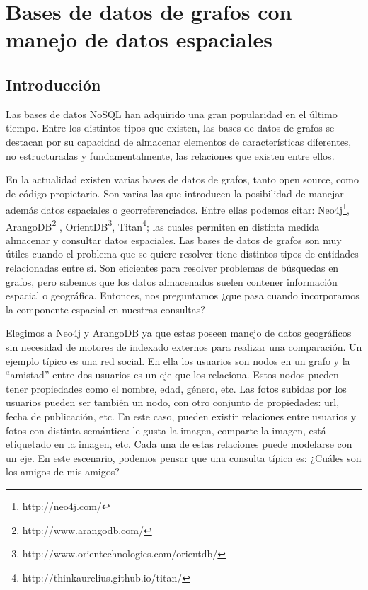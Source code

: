\documentclass{llncs}
\begin{document}
\maketitle              %

\begin{abstract} The abstract should summarize the contents of the
paper using at least 70 and at most 150 words. It will be set in
9-point font size and be inset 1.0 cm from the right and left margins.
There will be two blank lines before and after the Abstract. \dots
{}
\end{abstract} %

\section{Bases de datos de grafos con manejo de datos espaciales}
\subsection{Introducción} %
Las bases de datos NoSQL han
adquirido una gran popularidad en el último tiempo. Entre los
distintos tipos que existen, las bases de datos de grafos se destacan
por su capacidad de almacenar elementos de características diferentes,
no estructuradas y fundamentalmente, las relaciones que existen entre
ellos.

En la actualidad existen varias bases de datos de grafos, tanto open
source, como de código propietario. Son varias las que introducen la
posibilidad de manejar además datos espaciales o georreferenciados.
Entre ellas podemos citar: Neo4j\footnote{http://neo4j.com/}, ArangoDB\footnote{http://www.arangodb.com/}
, OrientDB\footnote{http://www.orientechnologies.com/orientdb/}, Titan\footnote{http://thinkaurelius.github.io/titan/}; las
cuales permiten en distinta medida almacenar y consultar datos
espaciales. Las bases de datos de grafos son muy útiles cuando el
problema que se quiere resolver tiene distintos tipos de entidades
relacionadas entre sí.  Son eficientes para resolver problemas de
búsquedas en grafos, pero sabemos que los datos almacenados suelen
contener información espacial o geográfica. Entonces, nos preguntamos
¿que pasa cuando incorporamos la componente espacial en nuestras
consultas?

Elegimos a Neo4j y ArangoDB ya que estas poseen manejo de datos
geográficos sin necesidad de motores de indexado externos para
realizar una comparación. Un ejemplo típico es una red social. En ella
los usuarios son nodos en un grafo y la “amistad” entre dos usuarios
es un eje que los relaciona. Estos nodos pueden tener propiedades como
el nombre, edad, género, etc. Las fotos subidas por los usuarios
pueden ser también un nodo, con otro conjunto de propiedades: url,
fecha de publicación, etc. En este caso, pueden existir relaciones
entre usuarios y fotos con distinta semántica: le gusta la imagen,
comparte la imagen, está etiquetado en la imagen, etc. Cada una de
estas relaciones puede modelarse con un eje. En este escenario,
podemos pensar que una consulta típica es: ¿Cuáles son los amigos de
mis amigos?
\end{document}
